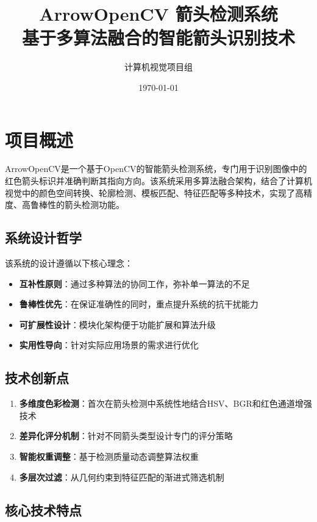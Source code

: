 \documentclass[12pt]{article}
\title{\textbf{ArrowOpenCV 箭头检测系统}\\ 
       \large 基于多算法融合的智能箭头识别技术}
\author{计算机视觉项目组}
\date{\today}
\begin{document}
\maketitle

\tableofcontents
\newpage

\section{项目概述}

ArrowOpenCV是一个基于OpenCV的智能箭头检测系统，专门用于识别图像中的红色箭头标识并准确判断其指向方向。该系统采用多算法融合架构，结合了计算机视觉中的颜色空间转换、轮廓检测、模板匹配、特征匹配等多种技术，实现了高精度、高鲁棒性的箭头检测功能。

\subsection{系统设计哲学}

该系统的设计遵循以下核心理念：

\begin{itemize}
    \item \textbf{互补性原则}：通过多种算法的协同工作，弥补单一算法的不足
    \item \textbf{鲁棒性优先}：在保证准确性的同时，重点提升系统的抗干扰能力
    \item \textbf{可扩展性设计}：模块化架构便于功能扩展和算法升级
    \item \textbf{实用性导向}：针对实际应用场景的需求进行优化
\end{itemize}

\subsection{技术创新点}

\begin{enumerate}
    \item \textbf{多维度色彩检测}：首次在箭头检测中系统性地结合HSV、BGR和红色通道增强技术
    \item \textbf{差异化评分机制}：针对不同箭头类型设计专门的评分策略
    \item \textbf{智能权重调整}：基于检测质量动态调整算法权重
    \item \textbf{多层次过滤}：从几何约束到特征匹配的渐进式筛选机制
\end{enumerate}

\subsection{核心技术特点}
\end{document}
